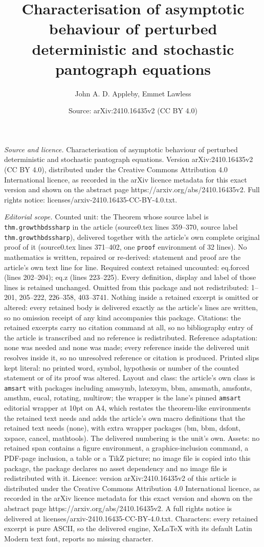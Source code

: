 \documentclass[10pt,a4paper]{amsart}
\title[Characterisation of asymptotic behaviour of perturbed determ]{Characterisation of asymptotic behaviour of perturbed deterministic and stochastic pantograph equations}
\author{John A. D. Appleby, Emmet Lawless}
\date{Source: arXiv:2410.16435v2 (CC BY 4.0)}
\begin{document}
\maketitle

\noindent\emph{Source and licence.} Characterisation of asymptotic behaviour of perturbed deterministic and stochastic pantograph equations. Version arXiv:2410.16435v2 (CC BY 4.0), distributed under the Creative Commons Attribution 4.0 International licence, as recorded in the arXiv licence metadata for this exact version and shown on the abstract page https://arxiv.org/abs/2410.16435v2. Full rights notice: licenses/arxiv-2410.16435-CC-BY-4.0.txt.\par\smallskip

\noindent\textit{Editorial scope.} Counted unit: the Theorem whose source label is \texttt{thm.growthbdssharp} in the article (source0.tex lines 359--370, source label \texttt{thm.growthbdssharp}), delivered together with the article's own complete original proof of it (source0.tex lines 371--402, one \texttt{proof} environment of 32 lines). No mathematics is written, repaired or re-derived: statement and proof are the article's own text line for line. Required context retained uncounted: eq.forced (lines 202--204); eq.z (lines 223--225). Every definition, display and label of those lines is retained unchanged. Omitted from this package and not redistributed: 1--201, 205--222, 226--358, 403--3741. Nothing inside a retained excerpt is omitted or altered: every retained body is delivered exactly as the article's lines are written, so no omission receipt of any kind accompanies this package. Citations: the retained excerpts carry no citation command at all, so no bibliography entry of the article is transcribed and no reference is redistributed. Reference adaptation: none was needed and none was made; every reference inside the delivered unit resolves inside it, so no unresolved reference or citation is produced. Printed slips kept literal: no printed word, symbol, hypothesis or number of the counted statement or of its proof was altered. Layout and class: the article's own class is \texttt{amsart} with packages including amssymb, latexsym, bbm, amsmath, amsfonts, amsthm, eucal, rotating, multirow; the wrapper is the lane's pinned \texttt{amsart} editorial wrapper at 10pt on A4, which restates the theorem-like environments the retained text needs and adds the article's own macro definitions that the retained text needs (none), with extra wrapper packages (bm, bbm, dsfont, xspace, cancel, mathtools). The delivered numbering is the unit's own. Assets: no retained span contains a figure environment, a graphics-inclusion command, a PDF-page inclusion, a table or a TikZ picture; no image file is copied into this package, the package declares no asset dependency and no image file is redistributed with it. Licence: version arXiv:2410.16435v2 of this article is distributed under the Creative Commons Attribution 4.0 International licence, as recorded in the arXiv licence metadata for this exact version and shown on the abstract page https://arxiv.org/abs/2410.16435v2. A full rights notice is delivered at licenses/arxiv-2410.16435-CC-BY-4.0.txt. Characters: every retained excerpt is pure ASCII, so the delivered engine, XeLaTeX with its default Latin Modern text font, reports no missing character.
\end{document}
